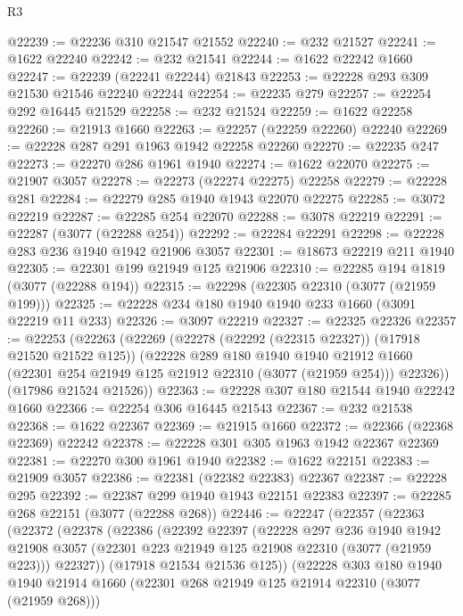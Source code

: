 \begin{lexlean}{R3}
\begin{coremodule}
@22239 := @22236 @310 @21547 @21552
@22240 := @232 @21527
@22241 := @1622 @22240
@22242 := @232 @21541
@22244 := @1622 @22242 @1660
@22247 := @22239 (@22241 @22244) @21843
@22253 := @22228 @293 @309 @21530 @21546 @22240 @22244
@22254 := @22235 @279
@22257 := @22254 @292 @16445 @21529
@22258 := @232 @21524
@22259 := @1622 @22258
@22260 := @21913 @1660
@22263 := @22257 (@22259 @22260) @22240
@22269 := @22228 @287 @291 @1963 @1942 @22258 @22260
@22270 := @22235 @247
@22273 := @22270 @286 @1961 @1940
@22274 := @1622 @22070
@22275 := @21907 @3057
@22278 := @22273 (@22274 @22275) @22258
@22279 := @22228 @281
@22284 := @22279 @285 @1940 @1943 @22070 @22275
@22285 := @3072 @22219
@22287 := @22285 @254 @22070
@22288 := @3078 @22219
@22291 := @22287 (@3077 (@22288 @254))
@22292 := @22284 @22291
@22298 := @22228 @283 @236 @1940 @1942 @21906 @3057
@22301 := @18673 @22219 @211 @1940
@22305 := @22301 @199 @21949 @125 @21906
@22310 := @22285 @194 @1819 (@3077 (@22288 @194))
@22315 := @22298 (@22305 @22310 (@3077 (@21959 @199)))
@22325 := @22228 @234 @180 @1940 @1940 @233 @1660 (@3091 @22219 @11 @233)
@22326 := @3097 @22219
@22327 := @22325 @22326
@22357 := @22253
    (@22263
      (@22269
        (@22278 (@22292 (@22315 @22327)) (@17918 @21520 @21522 @125))
        (@22228
          @289
          @180
          @1940
          @1940
          @21912
          @1660
          (@22301 @254 @21949 @125 @21912 @22310 (@3077 (@21959 @254)))
          @22326))
      (@17986 @21524 @21526))
@22363 := @22228 @307 @180 @21544 @1940 @22242 @1660
@22366 := @22254 @306 @16445 @21543
@22367 := @232 @21538
@22368 := @1622 @22367
@22369 := @21915 @1660
@22372 := @22366 (@22368 @22369) @22242
@22378 := @22228 @301 @305 @1963 @1942 @22367 @22369
@22381 := @22270 @300 @1961 @1940
@22382 := @1622 @22151
@22383 := @21909 @3057
@22386 := @22381 (@22382 @22383) @22367
@22387 := @22228 @295
@22392 := @22387 @299 @1940 @1943 @22151 @22383
@22397 := @22285 @268 @22151 (@3077 (@22288 @268))
@22446 := @22247
    (@22357
      (@22363
        (@22372
          (@22378
            (@22386
              (@22392
                @22397
                (@22228
                  @297
                  @236
                  @1940
                  @1942
                  @21908
                  @3057
                  (@22301 @223 @21949 @125 @21908 @22310 (@3077 (@21959 @223)))
                  @22327))
              (@17918 @21534 @21536 @125))
            (@22228
              @303
              @180
              @1940
              @1940
              @21914
              @1660
              (@22301 @268 @21949 @125 @21914 @22310 (@3077 (@21959 @268)))

\end{coremodule}
\end{lexlean}
